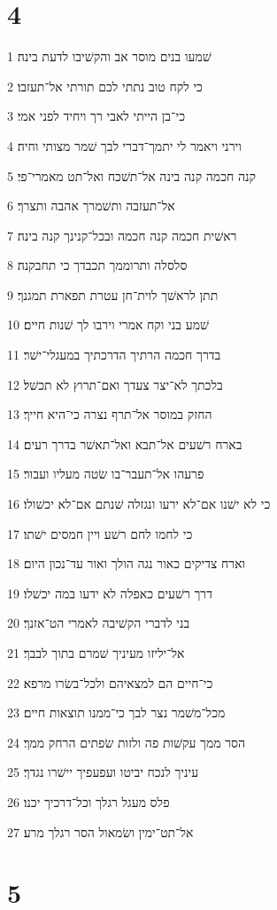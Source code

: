 \chapter{4}

\par 1 שׁמעו בנים מוסר אב והקשׁיבו לדעת בינה׃
\par 2 כי לקח טוב נתתי לכם תורתי אל־תעזבו׃
\par 3 כי־בן הייתי לאבי רך ויחיד לפני אמי׃
\par 4 וירני ויאמר לי יתמך־דברי לבך שׁמר מצותי וחיה׃
\par 5 קנה חכמה קנה בינה אל־תשׁכח ואל־תט מאמרי־פי׃
\par 6 אל־תעזבה ותשׁמרך אהבה ותצרך׃
\par 7 ראשׁית חכמה קנה חכמה ובכל־קנינך קנה בינה׃
\par 8 סלסלה ותרוממך תכבדך כי תחבקנה׃
\par 9 תתן לראשׁך לוית־חן עטרת תפארת תמגנך׃
\par 10 שׁמע בני וקח אמרי וירבו לך שׁנות חיים׃
\par 11 בדרך חכמה הרתיך הדרכתיך במעגלי־ישׁר׃
\par 12 בלכתך לא־יצר צעדך ואם־תרוץ לא תכשׁל׃
\par 13 החזק במוסר אל־תרף נצרה כי־היא חייך׃
\par 14 בארח רשׁעים אל־תבא ואל־תאשׁר בדרך רעים׃
\par 15 פרעהו אל־תעבר־בו שׂטה מעליו ועבור׃
\par 16 כי לא ישׁנו אם־לא ירעו ונגזלה שׁנתם אם־לא יכשׁולו׃
\par 17 כי לחמו לחם רשׁע ויין חמסים ישׁתו׃
\par 18 וארח צדיקים כאור נגה הולך ואור עד־נכון היום׃
\par 19 דרך רשׁעים כאפלה לא ידעו במה יכשׁלו׃
\par 20 בני לדברי הקשׁיבה לאמרי הט־אזנך׃
\par 21 אל־יליזו מעיניך שׁמרם בתוך לבבך׃
\par 22 כי־חיים הם למצאיהם ולכל־בשׂרו מרפא׃
\par 23 מכל־משׁמר נצר לבך כי־ממנו תוצאות חיים׃
\par 24 הסר ממך עקשׁות פה ולזות שׂפתים הרחק ממך׃
\par 25 עיניך לנכח יביטו ועפעפיך יישׁרו נגדך׃
\par 26 פלס מעגל רגלך וכל־דרכיך יכנו׃
\par 27 אל־תט־ימין ושׂמאול הסר רגלך מרע׃

\chapter{5}

